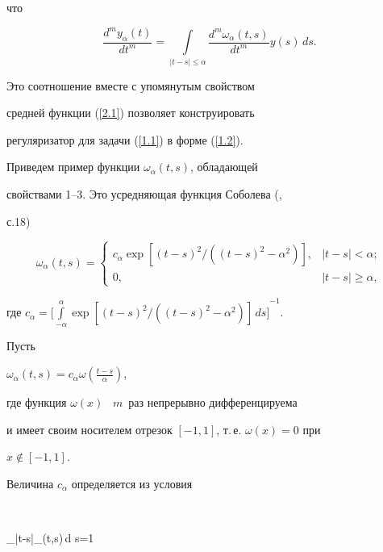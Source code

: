 что


$$


\frac{d^m y_\alpha(t)}{d


t^m}=\int\limits_{|t-s|\leq\alpha}\frac{d^m \omega_\alpha(t,s)}{d


t^m}y(s)\,d s.


$$


Это соотношение вместе с упомянутым свойством


средней функции (\ref{2.1}) позволяет конструировать


регуляризатор для задачи (\ref{1.1}) в форме (\ref{1.2}).





Приведем пример функции $\omega_\alpha(t,s)$, обладающей


свойствами 1--3. Это усредняющая функция Соболева (\cite{Sob},


с.18)


\begin{equation}\label{exmpl}


\omega_\alpha(t,s)=


\begin{cases}


c_\alpha\exp\left[(t-s)^2/\left((t-s)^2-\alpha^2\right)\right], & |t-s|<\alpha;\\


0, & |t-s|\geq\alpha,


\end{cases}


\end{equation}


где $c_\alpha={\Big[\int\limits_{-\alpha}^{\alpha}


\exp\left[(t-s)^2/\left((t-s)^2-\alpha^2\right)\right]\,d


s\Big]}^{-1}$.





Пусть


$\omega_\alpha(t,s)=c_\alpha\omega\left(\frac{t-s}{\alpha}\right)$,


где функция $\omega(x)$ \ $m$~раз непрерывно дифференцируема


и имеет своим носителем отрезок $[-1,1]$, т.\,е. $\omega(x)=0$ при


$x\notin [-1,1]$.


Величина $c_\alpha$ определяется из условия


$$


\int\limits_{|t-s|\leq\alpha}\omega_\alpha(t,s)\,d s=1


